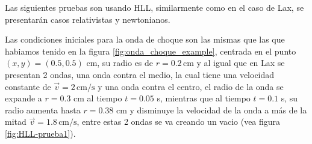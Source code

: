 \documentclass[12pt,a4paper]{book}
\begin{document}


%
%


Las siguientes pruebas son usando HLL, similarmente como en el caso de Lax, se presentarán casos relativistas y newtonianos. 



Las condiciones iniciales para la onda de choque son las mismas que las que habiamos tenido en la figura \ref{fig:onda_choque_example}, centrada en el punto $(x,y)=(0.5,0.5)$ cm, su radio es de $r = 0.2 \, \mathrm{cm}$ y al igual que en Lax se presentan 2 ondas, una onda contra el medio, la cual tiene una velocidad constante de $\vec{v}  = 2 \, \mathrm{cm}/\mathrm{s}$ y una onda contra el centro, el radio de la onda se expande a $r = 0.3$ cm al tiempo $t=0.05$ s, mientras que al tiempo $t = 0.1$ s, su radio aumenta hasta $r = 0.38$ cm y disminuye la velocidad de la onda a más de la mitad $\vec{v}=1.8 \, \mathrm{cm}/\mathrm{s}$, entre estas 2 ondas se va creando un vacio (vea figura \ref{fig:HLL-prueba1}).
\end{document}
